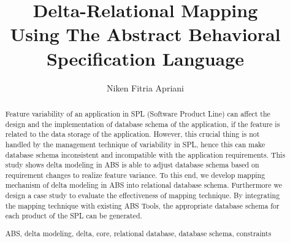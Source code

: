 \documentclass[runningheads,a4paper]{llncs}
\newcommand{\keywords}[1]{\par\addvspace\baselineskip
\noindent\keywordname\enspace\ignorespaces#1}
\begin{document}
\mainmatter  %

\title{Delta-Relational Mapping\\Using The Abstract Behavioral Specification Language}


%
%
\author{Niken Fitria Apriani}
%


%
%

\maketitle


\begin{abstract}
Feature variability of an application in SPL (Software Product Line) can affect the design and the implementation of database schema of the application, if the feature is related to the data storage of the application. However, this crucial thing is not handled by the management technique of variability in SPL, hence this can make database schema inconsistent and incompatible with the application requirements. This study shows delta modeling in ABS is able to adjust database schema based on requirement changes to realize feature variance. To this end, we develop mapping mechanism of delta modeling in ABS into relational database schema. Furthermore we design a case study to evaluate the effectiveness of mapping technique. By integrating the mapping technique with existing ABS Tools, the appropriate database schema for each product of the SPL can be generated. 
\keywords{ABS, delta modeling, delta, core, relational database, database schema, constraints}
\end{abstract}
\end{document}
